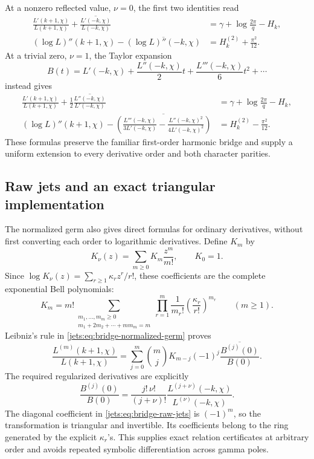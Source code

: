 At a nonzero reflected value, \(\nu=0\), the first two identities
read
\begin{align}
 \frac{L'(k+1,\chi)}{L(k+1,\chi)}
 +\overline{\frac{L'(-k,\chi)}{L(-k,\chi)}}
 &=\gamma+\log\frac{2\pi}{q}-H_k,
 \label{jets:eq:bridge-first-nonzero}\\
 (\log L)''(k+1,\chi)
 -\overline{(\log L)''(-k,\chi)}
 &=H_k^{(2)}+\frac{\pi^2}{12}.
 \label{jets:eq:bridge-second-nonzero}
\end{align}
At a trivial zero, \(\nu=1\), the Taylor expansion
\[
 B(t)=L'(-k,\chi)
   +\frac{L''(-k,\chi)}2t
   +\frac{L'''(-k,\chi)}6t^2+\cdots
\]
instead gives
\begin{align}
 \frac{L'(k+1,\chi)}{L(k+1,\chi)}
 +\frac12\overline{\frac{L''(-k,\chi)}{L'(-k,\chi)}}
 &=\gamma+\log\frac{2\pi}{q}-H_k,
 \label{jets:eq:bridge-first-zero}\\
 (\log L)''(k+1,\chi)
 -\overline{\left(
    \frac{L'''(-k,\chi)}{3L'(-k,\chi)}
   -\frac{L''(-k,\chi)^2}{4L'(-k,\chi)^2}
   \right)}
 &=H_k^{(2)}-\frac{\pi^2}{12}.
 \label{jets:eq:bridge-second-zero}
\end{align}
These formulas preserve the familiar first-order harmonic
bridge and supply a uniform extension to every derivative
order and both character parities.

\subsection{Raw jets and an exact triangular implementation}

The normalized germ also gives direct formulas for ordinary
derivatives, without first converting each order to logarithmic
derivatives. Define \(K_m\) by
\[
 K_\nu(z)=\sum_{m\geq0}K_m\frac{z^m}{m!},\qquad K_0=1.
\]
Since \(\log K_\nu(z)=\sum_{r\geq1}\kappa_rz^r/r!\),
these coefficients are the complete exponential Bell polynomials:
\begin{equation}
 K_m=
 m!\!\!\sum_{\substack{m_1,\ldots,m_m\geq0\\
                     m_1+2m_2+\cdots+mm_m=m}}
 \prod_{r=1}^{m}\frac1{m_r!}
       \left(\frac{\kappa_r}{r!}\right)^{m_r}
 \qquad(m\geq1).
 \label{jets:eq:bridge-bell-coefficients}
\end{equation}
Leibniz's rule in \eqref{jets:eq:bridge-normalized-germ} proves
\begin{equation}
 \frac{L^{(m)}(k+1,\chi)}{L(k+1,\chi)}
 =
 \sum_{j=0}^{m}\binom mj K_{m-j}(-1)^j
       \overline{\frac{B^{(j)}(0)}{B(0)}}.
 \label{jets:eq:bridge-raw-jets}
\end{equation}
The required regularized derivatives are explicitly
\begin{equation}
 \frac{B^{(j)}(0)}{B(0)}
 =\frac{j!\,\nu!}{(j+\nu)!}
    \frac{L^{(j+\nu)}(-k,\chi)}{L^{(\nu)}(-k,\chi)}.
 \label{jets:eq:bridge-regularized-raw-jets}
\end{equation}
The diagonal coefficient in
\eqref{jets:eq:bridge-raw-jets} is \((-1)^m\), so the transformation
is triangular and invertible. Its coefficients belong to the
ring generated by the explicit \(\kappa_r\)'s. This supplies
exact relation certificates at arbitrary order and avoids
repeated symbolic differentiation across gamma poles.

